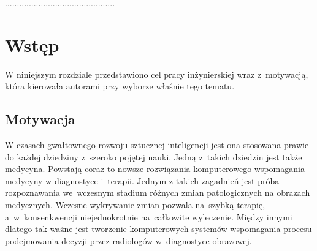 \documentclass[a4paper,11pt,twoside,openright]{report}
\theoremstyle{definition}
\begin{document}
\begin{flushright}
  \begin{minipage}{50mm}
    \begin{center}
      ..............................................

    \end{center}
  \end{minipage}
\end{flushright}

\thispagestyle{empty}
\newpage

\null\thispagestyle{empty}\newpage


\tableofcontents
\thispagestyle{empty}


\null\thispagestyle{empty}\newpage
\pagestyle{fancy}
\setcounter{page}{11} %

\chapter*{Wstęp}

W niniejszym rozdziale przedstawiono cel pracy inżynierskiej wraz z~motywacją,
która kierowała autorami przy wyborze właśnie tego tematu.

\section*{Motywacja}

W czasach gwałtownego rozwoju sztucznej inteligencji jest ona stosowana prawie
do każdej dziedziny z~szeroko pojętej nauki. Jedną z~takich dziedzin jest także medycyna.
Powstają coraz to nowsze rozwiązania komputerowego wspomagania medycyny w diagnostyce i~terapii.
Jednym z takich zagadnień jest próba rozpoznawania we~wczesnym stadium różnych zmian
patologicznych na obrazach medycznych. Wczesne wykrywanie zmian pozwala
na~szybką terapię, a~w~konsenkwencji niejednokrotnie na~całkowite wyleczenie. Między innymi dlatego
tak ważne jest tworzenie komputerowych systemów wspomagania procesu podejmowania
decyzji przez radiologów w~diagnostyce obrazowej.
\end{document}
